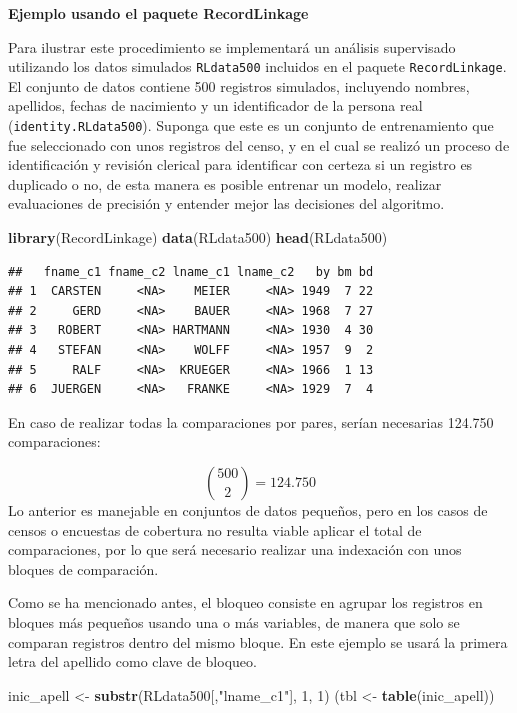 \documentclass[
  12pt,
]{book}
\newenvironment{Shaded}{\begin{snugshade}}{\end{snugshade}}
\newcommand{\DecValTok}[1]{\textcolor[rgb]{0.00,0.00,0.81}{#1}}
\newcommand{\FunctionTok}[1]{\textcolor[rgb]{0.13,0.29,0.53}{\textbf{#1}}}
\newcommand{\NormalTok}[1]{#1}
\newcommand{\OtherTok}[1]{\textcolor[rgb]{0.56,0.35,0.01}{#1}}
\newcommand{\StringTok}[1]{\textcolor[rgb]{0.31,0.60,0.02}{#1}}
\begin{document}
\textbf{Ejemplo usando el paquete RecordLinkage}

Para ilustrar este procedimiento se implementará un análisis supervisado utilizando los datos simulados \texttt{RLdata500} incluidos en el paquete \texttt{RecordLinkage}. El conjunto de datos contiene 500 registros simulados, incluyendo nombres, apellidos, fechas de nacimiento y un identificador de la persona real (\texttt{identity.RLdata500}). Suponga que este es un conjunto de entrenamiento que fue seleccionado con unos registros del censo, y en el cual se realizó un proceso de identificación y revisión clerical para identificar con certeza si un registro es duplicado o no, de esta manera es posible entrenar un modelo, realizar evaluaciones de precisión y entender mejor las decisiones del algoritmo.

\begin{Shaded}
\begin{Highlighting}[]
\FunctionTok{library}\NormalTok{(RecordLinkage)}
\FunctionTok{data}\NormalTok{(RLdata500)}
\FunctionTok{head}\NormalTok{(RLdata500)}
\end{Highlighting}
\end{Shaded}

\begin{verbatim}
##   fname_c1 fname_c2 lname_c1 lname_c2   by bm bd
## 1  CARSTEN     <NA>    MEIER     <NA> 1949  7 22
## 2     GERD     <NA>    BAUER     <NA> 1968  7 27
## 3   ROBERT     <NA> HARTMANN     <NA> 1930  4 30
## 4   STEFAN     <NA>    WOLFF     <NA> 1957  9  2
## 5     RALF     <NA>  KRUEGER     <NA> 1966  1 13
## 6  JUERGEN     <NA>   FRANKE     <NA> 1929  7  4
\end{verbatim}

En caso de realizar todas la comparaciones por pares, serían necesarias 124.750 comparaciones:

\[\binom{500}{2} = 124.750\]
Lo anterior es manejable en conjuntos de datos pequeños, pero en los casos de censos o encuestas de cobertura no resulta viable aplicar el total de comparaciones, por lo que será necesario realizar una indexación con unos bloques de comparación.

Como se ha mencionado antes, el bloqueo consiste en agrupar los registros en bloques más pequeños usando una o más variables, de manera que solo se comparan registros dentro del mismo bloque. En este ejemplo se usará la primera letra del apellido como clave de bloqueo.

\begin{Shaded}
\begin{Highlighting}[]
\NormalTok{inic\_apell }\OtherTok{\textless{}{-}} \FunctionTok{substr}\NormalTok{(RLdata500[,}\StringTok{"lname\_c1"}\NormalTok{], }\DecValTok{1}\NormalTok{, }\DecValTok{1}\NormalTok{)}
\NormalTok{(tbl }\OtherTok{\textless{}{-}} \FunctionTok{table}\NormalTok{(inic\_apell))}
\end{Highlighting}
\end{Shaded}
\end{document}
